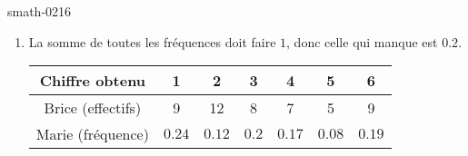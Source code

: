 
\begin{corrige}{smath-0216}

    \begin{enumerate}
        \item
            La somme de toutes les fréquences doit faire \( 1\), donc celle qui manque est \( 0.2\).


            \begin{center}
        \begin{tabular}[]{|c||c|c|c|c|c|c|}
            \hline
            Chiffre obtenu&1&2&3&4&5&6\\
            \hline\hline
            Brice (effectifs)&9&12&8&7&5&9\\
            \hline
            Marie (fréquence)&$0.24$&$0.12$&$0.2$&$0.17$&$0.08$&$0.19$\\
            \hline
        \end{tabular}
            \end{center}



\end{enumerate}
\end{corrige}
